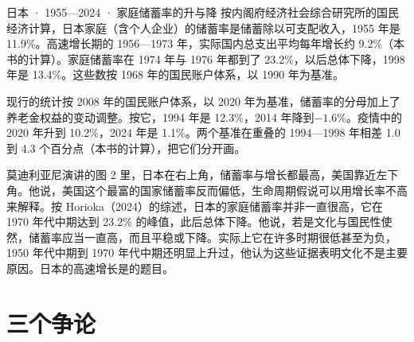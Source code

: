 \begin{case}{日本 · 1955—2024 · 家庭储蓄率的升与降}
按内阁府经济社会综合研究所的国民经济计算，日本家庭（含个人企业）的储蓄率是储蓄除以可支配收入，1955 年是 11.9\%\cite{esri68}。高速增长期的 1956—1973 年，实际国内总支出平均每年增长约 9.2\%（本书的计算）\cite{esri68}。家庭储蓄率在 1974 年与 1976 年都到了 23.2\%，以后总体下降，1998 年是 13.4\%\cite{esri68}。这些数按 1968 年的国民账户体系，以 1990 年为基准\cite{esri68}。

现行的统计按 2008 年的国民账户体系，以 2020 年为基准，储蓄率的分母加上了养老金权益的变动调整\cite{esri2024}。按它，1994 年是 12.3\%，2014 年降到$-1.6\%$\cite{esri2024}。疫情中的 2020 年升到 10.2\%，2024 年是 1.1\%\cite{esri2024}。两个基准在重叠的 1994—1998 年相差 1.0 到 4.3 个百分点（本书的计算），把它们分开画。

莫迪利亚尼演讲的图 2 里，日本在右上角，储蓄率与增长都最高，美国靠近左下角\cite{modigliani1985}。他说，美国这个最富的国家储蓄率反而偏低，生命周期假说可以用增长率不高来解释\cite{modigliani1985}。按 Horioka（2024）的综述，日本的家庭储蓄率并非一直很高，它在 1970 年代中期达到 23.2\% 的峰值，此后总体下降\cite{horioka2024}。他说，若是文化与国民性使然，储蓄率应当一直高，而且平稳或下降\cite{horioka2024}。实际上它在许多时期很低甚至为负，1950 年代中期到 1970 年代中期还明显上升过，他认为这些证据表明文化不是主要原因\cite{horioka2024}。日本的高速增长是的题目。
\end{case}


\section{三个争论}\label{sec:consumption-debate}

